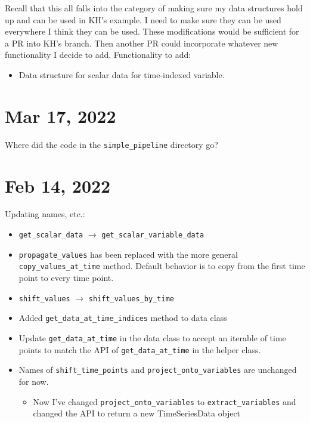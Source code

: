 \documentclass{article}
\begin{document}
Recall that this all falls into the category of making sure my data structures
hold up and can be used in KH's example. I need to make sure they can be used
everywhere I think they can be used.
These modifications would be sufficient for a PR into KH's branch. Then another
PR could incorporate whatever new functionality I decide to add.
Functionality to add:
\begin{itemize}
  \item Data structure for scalar data for time-indexed variable.
\end{itemize}

\section{Mar 17, 2022}

Where did the code in the \texttt{simple\_pipeline} directory go?

\section{Feb 14, 2022}

Updating names, etc.:
\begin{itemize}
  \item \texttt{get\_scalar\_data} $\rightarrow$
    \texttt{get\_scalar\_variable\_data}
  \item \texttt{propagate\_values} has been replaced with the more
    general \texttt{copy\_values\_at\_time} method.
    Default behavior is to copy from the first time point to every
    time point.
  \item \texttt{shift\_values} $\rightarrow$
    \texttt{shift\_values\_by\_time}
  \item Added \texttt{get\_data\_at\_time\_indices} method to data class
  \item Update \texttt{get\_data\_at\_time} in the data class to accept
    an iterable of time points to match the API of \texttt{get\_data\_at\_time}
    in the helper class.
  \item Names of \texttt{shift\_time\_points} and
    \texttt{project\_onto\_variables} are unchanged for now.
    \begin{itemize}
      \item Now I've changed \texttt{project\_onto\_variables} to
	\texttt{extract\_variables} and changed the API to return a new
	TimeSeriesData object
    \end{itemize}
\end{itemize}
\end{document}
